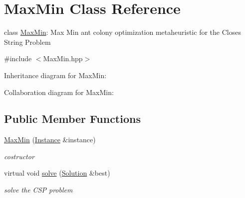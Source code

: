 \hypertarget{classMaxMin}{}\section{Max\+Min Class Reference}
\label{classMaxMin}


class \hyperlink{classMaxMin}{Max\+Min}\+: Max Min ant colony optimization metaheuristic for the Closes String Problem  




{\ttfamily \#include $<$Max\+Min.\+hpp$>$}



Inheritance diagram for Max\+Min\+:


Collaboration diagram for Max\+Min\+:
\subsection*{Public Member Functions}
\begin{DoxyCompactItemize}
\item 
\hyperlink{classMaxMin_a51241e59fae85aaa8fc1cc9a200422ba}{Max\+Min} (\hyperlink{classInstance}{Instance} \&instance)
\begin{DoxyCompactList}\small\item\em costructor \end{DoxyCompactList}\item 
virtual void \hyperlink{classMaxMin_a27fd649b6f2efc343293d759ee6b5e9d}{solve} (\hyperlink{classSolution}{Solution} \&best)
\begin{DoxyCompactList}\small\item\em solve the C\+SP problem \end{DoxyCompactList}\end{DoxyCompactItemize}
